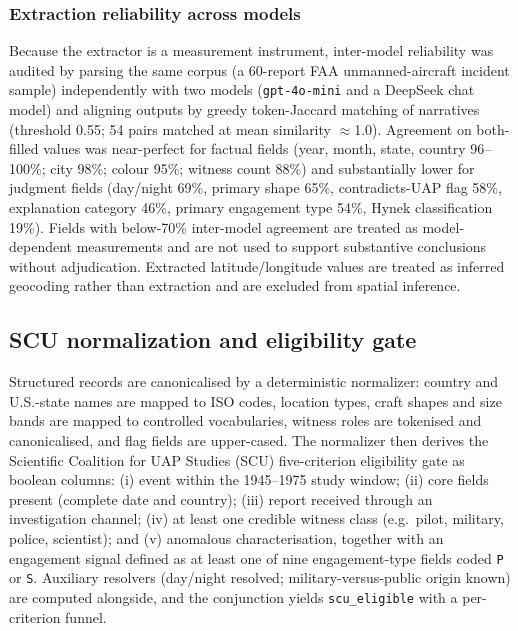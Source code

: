 \documentclass[11pt,a4paper]{article}
\newcommand{\field}[1]{\texttt{#1}}
\begin{document}
\subsubsection{Extraction reliability across models}
Because the extractor is a measurement instrument, inter-model reliability was audited
by parsing the same corpus (a 60-report FAA unmanned-aircraft incident sample)
independently with two models (\texttt{gpt-4o-mini} and a DeepSeek chat model) and
aligning outputs by greedy token-Jaccard matching of narratives (threshold 0.55;
54 pairs matched at mean similarity $\approx$1.0). Agreement on both-filled values was
near-perfect for factual fields (year, month, state, country 96--100\%; city 98\%;
colour 95\%; witness count 88\%) and substantially lower for judgment fields
(day/night 69\%, primary shape 65\%, contradicts-UAP flag 58\%, explanation category
46\%, primary engagement type 54\%, Hynek classification 19\%). Fields with
below-70\% inter-model agreement are treated as model-dependent measurements and are
not used to support substantive conclusions without adjudication. Extracted
latitude/longitude values are treated as inferred geocoding rather than extraction and
are excluded from spatial inference.

\subsection{SCU normalization and eligibility gate}

Structured records are canonicalised by a deterministic normalizer: country and
U.S.-state names are mapped to ISO codes, location types, craft shapes and size bands
are mapped to controlled vocabularies, witness roles are tokenised and canonicalised,
and flag fields are upper-cased. The normalizer then derives the Scientific Coalition
for UAP Studies (SCU) five-criterion eligibility gate as boolean columns: (i) event
within the 1945--1975 study window; (ii) core fields present (complete date and
country); (iii) report received through an investigation channel; (iv) at least one
credible witness class (e.g.\ pilot, military, police, scientist); and (v) anomalous
characterisation, together with an engagement signal defined as at least one of nine
engagement-type fields coded \texttt{P} or \texttt{S}. Auxiliary resolvers (day/night
resolved; military-versus-public origin known) are computed alongside, and the
conjunction yields \field{scu\_eligible} with a per-criterion funnel.
\end{document}
